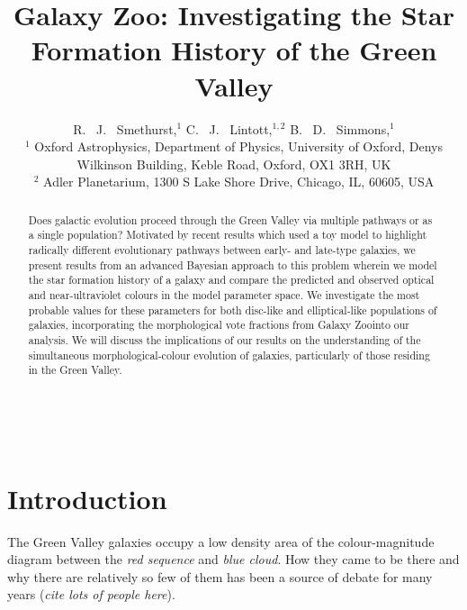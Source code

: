 \documentclass{mn2e}
\begin{document}
\title[The Star Fomation History of the Green Valley]{Galaxy Zoo: Investigating the Star Formation History of the Green Valley}
\author[Smethurst et al. 2014]{R. ~J. ~Smethurst,$^1$ C. ~J. ~Lintott,$^{1,2}$ B. ~D. ~Simmons,$^{1}$ \\ $^1$ Oxford Astrophysics, Department of Physics, University of Oxford, Denys Wilkinson Building, Keble Road, Oxford, OX1 3RH, UK \\ $^2$ Adler Planetarium, 1300 S Lake Shore Drive, Chicago, IL, 60605, USA }

\maketitle

\begin{abstract}
Does galactic evolution proceed through the Green Valley via multiple pathways or as a single population? Motivated by recent results which used a toy model to highlight radically different evolutionary pathways between early- and late-type galaxies, we present results from an advanced Bayesian approach to this problem wherein we model the star formation history of a galaxy and compare the predicted and observed optical and near-ultraviolet colours in the model parameter space. We investigate the most probable values for these parameters for both disc-like and elliptical-like populations of galaxies, incorporating the morphological vote fractions from Galaxy Zoo\footnotemark[1] into our analysis. We will discuss the implications of our results on the understanding of the simultaneous morphological-colour evolution of galaxies, particularly of those residing in the Green Valley. 
\end{abstract}

\\

\section{Introduction}
The Green Valley galaxies occupy a low density area of the colour-magnitude diagram between the \emph{red sequence} and \emph{blue cloud}. How they came to be there and why there are relatively so few of them has been a source of debate for many years (\emph{cite lots of people here}).
\end{document}
